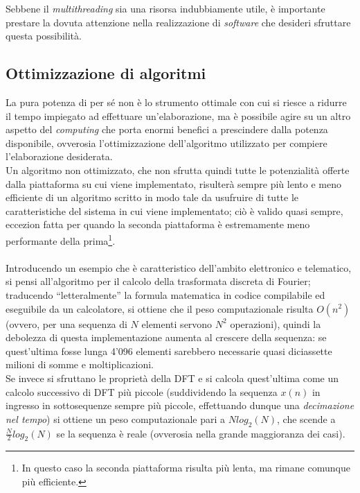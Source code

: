 Sebbene il \emph{multithreading} sia una risorsa indubbiamente utile, è
importante prestare la dovuta attenzione nella realizzazione di \emph{software}
che desideri sfruttare questa possibilità.

\subsection{Ottimizzazione di algoritmi}

La pura potenza di per sé non è lo strumento ottimale con cui si riesce a
ridurre il tempo impiegato ad effettuare un'elaborazione, ma è possibile agire
su un altro aspetto del \emph{computing} che porta enormi benefici a prescindere
dalla potenza disponibile, ovverosia l'ottimizzazione dell'algoritmo utilizzato
per compiere l'elaborazione desiderata. \\
Un algoritmo non ottimizzato, che non sfrutta quindi tutte le potenzialità
offerte dalla piattaforma su cui viene implementato, risulterà sempre più lento 
e meno efficiente di un algoritmo scritto in modo tale da usufruire di tutte le
caratteristiche del sistema in cui viene implementato; ciò è valido quasi 
sempre, eccezion fatta per quando la seconda piattaforma è estremamente meno
performante della prima\footnote{In questo caso la seconda piattaforma risulta
più lenta, ma rimane comunque più efficiente.}.
\\ \\ 
Introducendo un esempio che è caratteristico dell'ambito elettronico e
telematico, si pensi all'algoritmo per il calcolo della trasformata discreta
di Fourier; traducendo ``letteralmente'' la formula matematica in codice
compilabile ed eseguibile da un calcolatore, si ottiene che il peso
computazionale risulta $O(n^2)$ (ovvero, per una sequenza di $N$ elementi
servono $N^2$ operazioni), quindi la debolezza di questa implementazione aumenta
al crescere della sequenza: se quest'ultima fosse lunga 4'096 elementi
sarebbero necessarie quasi diciassette milioni di somme e moltiplicazioni. \\
Se invece si sfruttano le proprietà della DFT e si calcola quest'ultima
come un calcolo successivo di DFT più piccole (suddividendo la sequenza $x(n)$
in ingresso in sottosequenze sempre più piccole, effettuando dunque una
\emph{decimazione nel tempo}) si ottiene un peso computazionale pari a 
$Nlog_{2}(N)$, che scende a $\frac{N}{2}log_{2}(N)$ se la sequenza è reale
(ovverosia nella grande maggioranza dei casi). \\

